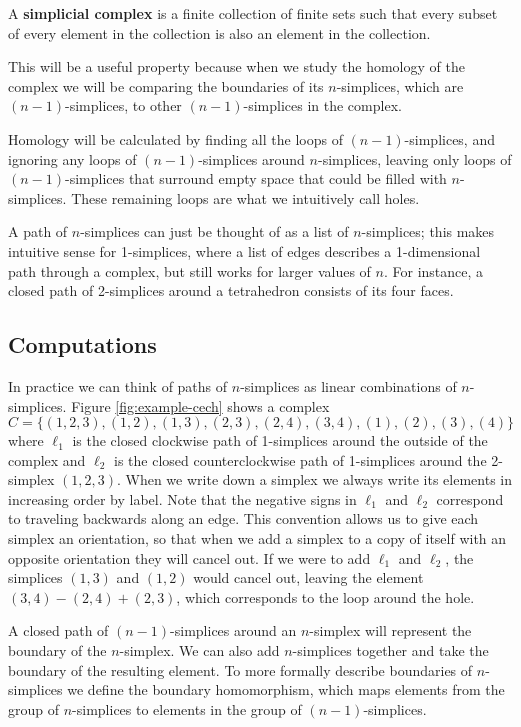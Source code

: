 \begin{definition}\label{def:simplicial-complex}
    A \textbf{simplicial complex} is a finite collection of finite sets such that every subset of every element in the collection is also an element in the collection. \cite{wagner}
\end{definition}

This will be a useful property because when we study the homology of the complex we will be comparing the boundaries of its \(n\)-simplices, which are \((n-1)\)-simplices, to other \((n-1)\)-simplices in the complex.

Homology will be calculated by finding all the loops of \((n-1)\)-simplices, and ignoring any loops of \((n-1)\)-simplices around \(n\)-simplices, leaving only loops of \((n-1)\)-simplices that surround empty space that could be filled with \(n\)-simplices.
These remaining loops are what we intuitively call holes.

A path of \(n\)-simplices can just be thought of as a list of \(n\)-simplices; this makes intuitive sense for 1-simplices, where a list of edges describes a 1-dimensional path through a complex, but still works for larger values of \(n\).
For instance, a closed path of 2-simplices around a tetrahedron consists of its four faces.

\subsection{Computations}

In practice we can think of paths of \(n\)-simplices as linear combinations of \(n\)-simplices.
Figure \ref{fig:example-cech} shows a complex \(C = \{ (1,2,3), (1,2), (1,3), (2,3), (2,4), (3,4), (1), (2), (3), (4) \}\) where \(\ell_1\) is the closed clockwise path of 1-simplices around the outside of the complex and \(\ell_2\) is the closed counterclockwise path of 1-simplices around the 2-simplex \((1,2,3)\).
When we write down a simplex we always write its elements in increasing order by label.
Note that the negative signs in \(\ell_1\) and \(\ell_2\) correspond to traveling backwards along an edge.
This convention allows us to give each simplex an orientation, so that when we add a simplex to a copy of itself with an opposite orientation they will cancel out.
If we were to add \(\ell_1\) and \(\ell_2\), the simplices \((1, 3)\) and \((1, 2)\) would cancel out, leaving the element \((3, 4) - (2, 4) + (2, 3)\), which corresponds to the loop around the hole.

A closed path of \((n-1)\)-simplices around an \(n\)-simplex will represent the boundary of the \(n\)-simplex.
We can also add \(n\)-simplices together and take the boundary of the resulting element.
To more formally describe boundaries of \(n\)-simplices we define the boundary homomorphism, which maps elements from the group of \(n\)-simplices to elements in the group of \((n-1)\)-simplices.

